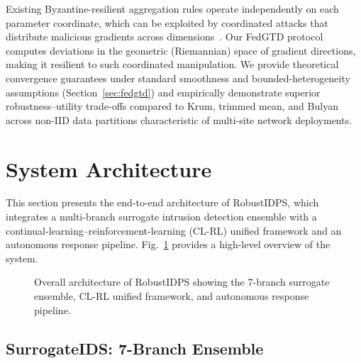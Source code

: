 \documentclass[journal,twoside]{IEEEtran}
\begin{document}
Existing Byzantine-resilient aggregation rules operate independently on
each parameter coordinate, which can be exploited by coordinated attacks that
distribute malicious gradients across dimensions~\cite{baruch2019little}.
Our FedGTD protocol computes deviations in the geometric (Riemannian) space
of gradient directions, making it resilient to such coordinated manipulation.
We provide theoretical convergence guarantees under standard smoothness
and bounded-heterogeneity assumptions (Section~\ref{sec:fedgtd}) and
empirically demonstrate superior robustness--utility trade-offs compared
to Krum, trimmed mean, and Bulyan across non-IID data partitions
characteristic of multi-site network deployments.



\section{System Architecture}
\label{sec:architecture}

This section presents the end-to-end architecture of RobustIDPS, which
integrates a multi-branch surrogate intrusion detection ensemble with a
continual-learning--reinforcement-learning (CL-RL) unified framework and an
autonomous response pipeline.  Fig.~\ref{fig:architecture} provides a
high-level overview of the system.

\begin{figure}[t]
\centering
{}
\caption{Overall architecture of RobustIDPS showing the 7-branch surrogate
ensemble, CL-RL unified framework, and autonomous response pipeline.}
\label{fig:architecture}
\end{figure}

\subsection{SurrogateIDS: 7-Branch Ensemble}
\label{sec:surrogate}
\end{document}
